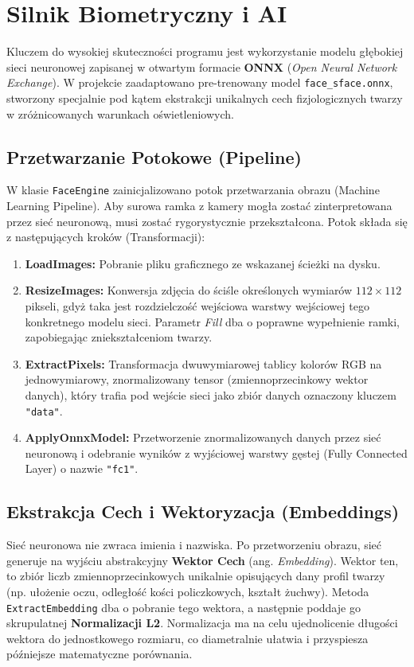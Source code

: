 \chapter{Silnik Biometryczny i AI}

Kluczem do wysokiej skuteczności programu jest wykorzystanie modelu głębokiej sieci neuronowej zapisanej w otwartym formacie \textbf{ONNX} (\textit{Open Neural Network Exchange}). W projekcie zaadaptowano pre-trenowany model \texttt{face\_sface.onnx}, stworzony specjalnie pod kątem ekstrakcji unikalnych cech fizjologicznych twarzy w zróżnicowanych warunkach oświetleniowych.

\section{Przetwarzanie Potokowe (Pipeline)}
W klasie \texttt{FaceEngine} zainicjalizowano potok przetwarzania obrazu (Machine Learning Pipeline). Aby surowa ramka z kamery mogła zostać zinterpretowana przez sieć neuronową, musi zostać rygorystycznie przekształcona. Potok składa się z następujących kroków (Transformacji):
\begin{enumerate}
    \item \textbf{LoadImages:} Pobranie pliku graficznego ze wskazanej ścieżki na dysku.
    \item \textbf{ResizeImages:} Konwersja zdjęcia do ściśle określonych wymiarów $112 \times 112$ pikseli, gdyż taka jest rozdzielczość wejściowa warstwy wejściowej tego konkretnego modelu sieci. Parametr \textit{Fill} dba o poprawne wypełnienie ramki, zapobiegając zniekształceniom twarzy.
    \item \textbf{ExtractPixels:} Transformacja dwuwymiarowej tablicy kolorów RGB na jednowymiarowy, znormalizowany tensor (zmiennoprzecinkowy wektor danych), który trafia pod wejście sieci jako zbiór danych oznaczony kluczem \texttt{"data"}.
    \item \textbf{ApplyOnnxModel:} Przetworzenie znormalizowanych danych przez sieć neuronową i odebranie wyników z wyjściowej warstwy gęstej (Fully Connected Layer) o nazwie \texttt{"fc1"}.
\end{enumerate}

\section{Ekstrakcja Cech i Wektoryzacja (Embeddings)}
Sieć neuronowa nie zwraca imienia i nazwiska. Po przetworzeniu obrazu, sieć generuje na wyjściu abstrakcyjny \textbf{Wektor Cech} (ang. \textit{Embedding}). Wektor ten, to zbiór liczb zmiennoprzecinkowych unikalnie opisujących dany profil twarzy (np. ułożenie oczu, odległość kości policzkowych, kształt żuchwy). Metoda \texttt{ExtractEmbedding} dba o pobranie tego wektora, a następnie poddaje go skrupulatnej \textbf{Normalizacji L2}. Normalizacja ma na celu ujednolicenie długości wektora do jednostkowego rozmiaru, co diametralnie ułatwia i przyspiesza późniejsze matematyczne porównania.

